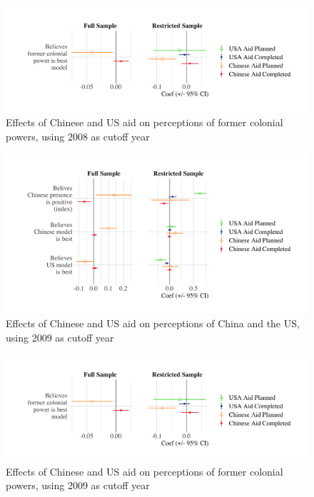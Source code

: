 \documentclass[9pt]{article}
\begin{document}
\begin{figure}[H]
\centering
\caption{Effects of Chinese and US aid on perceptions of former colonial powers, using 2008 as cutoff year}
\includegraphics[width=1\textwidth]{figures/figure_a5.png}
\end{figure}

\begin{figure}[H]
\centering
\caption{Effects of Chinese and US aid on perceptions of China and the US, using 2009 as cutoff year}
\includegraphics[width=1\textwidth]{figures/figure_a6.png}
\end{figure}

\begin{figure}[H]
\centering
\caption{Effects of Chinese and US aid on perceptions of former colonial powers, using 2009 as cutoff year}
\includegraphics[width=1\textwidth]{figures/figure_a7.png}
\end{figure}
\end{document}
